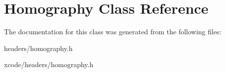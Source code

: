 \hypertarget{class_homography}{\section{Homography Class Reference}
\label{class_homography}
}


The documentation for this class was generated from the following files\-:\begin{DoxyCompactItemize}
\item 
headers/homography.\-h\item 
xcode/headers/homography.\-h\end{DoxyCompactItemize}
